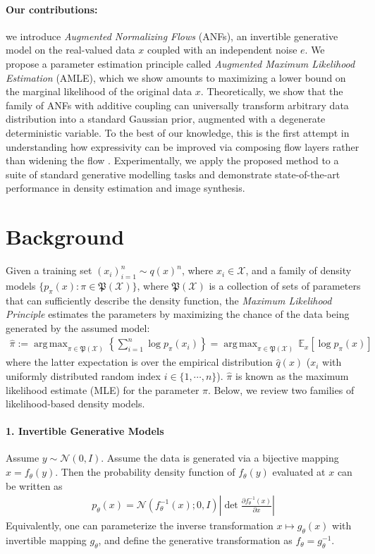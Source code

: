 \documentclass{article}
\def\gN{{\mathcal{N}}}
\def\gX{{\mathcal{X}}}
\newcommand{\E}{\mathbb{E}}
\DeclareMathOperator*{\argmax}{arg\,max}
\begin{document}
\paragraph{Our contributions:}
we introduce \emph{Augmented Normalizing Flows} (ANFs), an invertible generative model on the real-valued data $x$ coupled with an independent noise $e$. 
We propose a parameter estimation principle called \emph{Augmented Maximum Likelihood Estimation} (AMLE), which we show amounts to maximizing a lower bound on the marginal likelihood of the original data $x$. 
Theoretically, we show that the family of ANFs with additive coupling can universally transform arbitrary data distribution into a standard Gaussian prior, augmented with a degenerate deterministic variable. 
To the best of our knowledge, this is the first attempt in understanding how expressivity can be improved via composing flow layers  rather than widening the flow \citep{huang2018neural}. 
Experimentally, we apply the proposed method to a suite of standard generative modelling tasks and demonstrate state-of-the-art performance in density estimation and image synthesis. 






\section{Background}
\label{sec:background}
Given a training set $(x_i)_{i=1}^n \sim q(x)^n$, where $x_i\in\gX$, and a family of density models $\{p_\pi(x): \pi\in\mathfrak{P}(\gX)\}$, where $\mathfrak{P}(\gX)$ is a collection of sets of parameters that can sufficiently describe the density function, the \emph{Maximum Likelihood Principle} estimates the parameters by maximizing the chance of the data being generated by the assumed model:
\begin{align}
\hat{\pi}:=\argmax_{\pi\in\mathfrak{P}(\gX)}\left\{ \sum_{i=1}^n\log p_\pi(x_i)\right\} 
=\argmax_{\pi\in\mathfrak{P}(\gX)}\, \E_{x}[\log p_\pi(x)] 
\label{eq:mle}
\end{align}
where the latter expectation is over the empirical distribution $\hat{q}(x)$ ($x_i$ with uniformly distributed random index $i\in\{1,\cdots,n\}$). 
$\hat{\pi}$ is known as the maximum likelihood estimate (MLE) for the parameter $\pi$. 
Below, we review two families of likelihood-based density models. 


\paragraph{1. Invertible Generative Models}
Assume $y\sim \gN(0,I)$.
Assume the data is generated via a bijective mapping $x=f_\theta(y)$. 
Then the probability density function of $f_\theta(y)$ evaluated at $x$ can be written as
\begin{align}
p_\theta(x)=\gN(f_\theta^{-1}(x); 0,I)\left|\det\frac{\partial f_\theta^{-1}(x)}{\partial x}\right|
\label{eq:cov}
\end{align}
Equivalently, one can parameterize the inverse transformation $x\mapsto g_\theta(x)$ with invertible mapping $g_\theta$, and define the generative transformation as $f_\theta=g_\theta^{-1}$.
\end{document}

